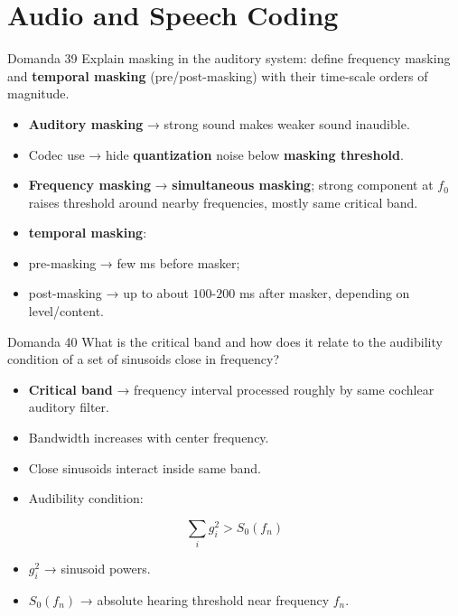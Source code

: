 \section{Audio and Speech Coding}




\begin{questionbox}{Domanda 39}
Explain masking in the auditory system: define frequency masking and \textbf{temporal masking} (pre/post-masking) with their time-scale orders of magnitude.
\end{questionbox}


\begin{itemize}
  \item \textbf{Auditory masking} → strong sound makes weaker sound inaudible.
  \item Codec use → hide \textbf{quantization} noise below \textbf{masking threshold}.
  \item \textbf{Frequency masking} → \textbf{simultaneous masking}; strong component at $f_0$ raises threshold around nearby frequencies, mostly same critical band.
  \item \textbf{\textbf{temporal masking}}:
  \item pre-masking → few ms before masker;
  \item post-masking → up to about $100$-$200$ ms after masker, depending on level/content.
\end{itemize}



\begin{questionbox}{Domanda 40}
What is the critical band and how does it relate to the audibility condition of a set of sinusoids close in frequency?
\end{questionbox}


\begin{itemize}
  \item \textbf{Critical band} → frequency interval processed roughly by same cochlear auditory filter.
  \item Bandwidth increases with center frequency.
  \item Close sinusoids interact inside same band.
  \item Audibility condition:
\end{itemize}


$$
\sum_i g_i^2 > S_0(f_n)
$$


\begin{itemize}
  \item $g_i^2$ → sinusoid powers.
  \item $S_0(f_n)$ → absolute hearing threshold near frequency $f_n$.
\end{itemize}



